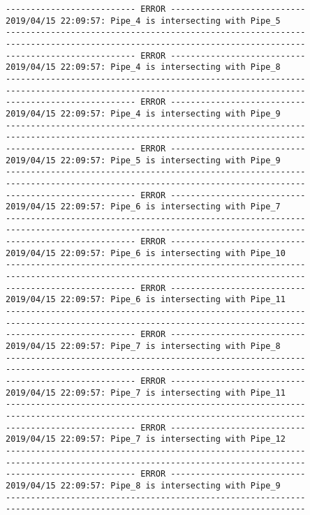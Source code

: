 \documentclass{article}
\begin{document}
{\begin{verbatim}
-------------------------- ERROR ---------------------------
2019/04/15 22:09:57: Pipe_4 is intersecting with Pipe_5
------------------------------------------------------------
------------------------------------------------------------
-------------------------- ERROR ---------------------------
2019/04/15 22:09:57: Pipe_4 is intersecting with Pipe_8
------------------------------------------------------------
------------------------------------------------------------
-------------------------- ERROR ---------------------------
2019/04/15 22:09:57: Pipe_4 is intersecting with Pipe_9
------------------------------------------------------------
------------------------------------------------------------
-------------------------- ERROR ---------------------------
2019/04/15 22:09:57: Pipe_5 is intersecting with Pipe_9
------------------------------------------------------------
------------------------------------------------------------
-------------------------- ERROR ---------------------------
2019/04/15 22:09:57: Pipe_6 is intersecting with Pipe_7
------------------------------------------------------------
------------------------------------------------------------
-------------------------- ERROR ---------------------------
2019/04/15 22:09:57: Pipe_6 is intersecting with Pipe_10
------------------------------------------------------------
------------------------------------------------------------
-------------------------- ERROR ---------------------------
2019/04/15 22:09:57: Pipe_6 is intersecting with Pipe_11
------------------------------------------------------------
------------------------------------------------------------
-------------------------- ERROR ---------------------------
2019/04/15 22:09:57: Pipe_7 is intersecting with Pipe_8
------------------------------------------------------------
------------------------------------------------------------
-------------------------- ERROR ---------------------------
2019/04/15 22:09:57: Pipe_7 is intersecting with Pipe_11
------------------------------------------------------------
------------------------------------------------------------
-------------------------- ERROR ---------------------------
2019/04/15 22:09:57: Pipe_7 is intersecting with Pipe_12
------------------------------------------------------------
------------------------------------------------------------
-------------------------- ERROR ---------------------------
2019/04/15 22:09:57: Pipe_8 is intersecting with Pipe_9
------------------------------------------------------------
------------------------------------------------------------

\end{verbatim}}
\end{document}
